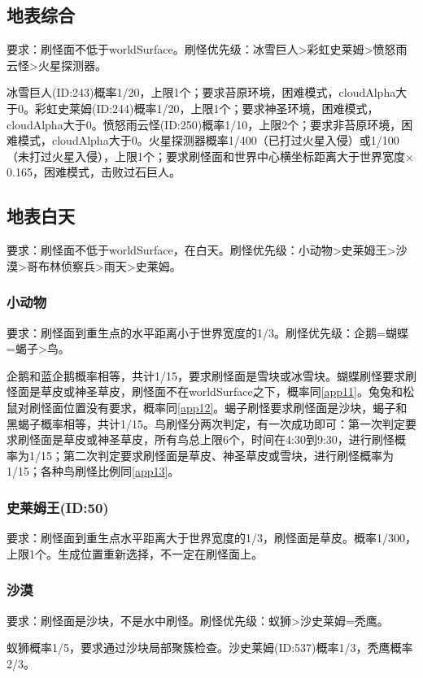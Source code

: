 \subsection{地表综合}
要求：刷怪面不低于worldSurface。刷怪优先级：冰雪巨人>彩虹史莱姆>愤怒雨云怪>火星探测器。

冰雪巨人(ID:243)概率1/20，上限1个；要求苔原环境，困难模式，cloudAlpha大于0。彩虹史莱姆(ID:244)概率1/20，上限1个；要求神圣环境，困难模式，cloudAlpha大于0。愤怒雨云怪(ID:250)概率1/10，上限2个；要求非苔原环境，困难模式，cloudAlpha大于0。火星探测器概率1/400（已打过火星入侵）或1/100（未打过火星入侵），上限1个；要求刷怪面和世界中心横坐标距离大于世界宽度$\times$0.165，困难模式，击败过石巨人。

\subsection{地表白天}
要求：刷怪面不低于worldSurface，在白天。刷怪优先级：小动物>史莱姆王>沙漠>哥布林侦察兵>雨天>史莱姆。

\subsubsection{小动物}
要求：刷怪面到重生点的水平距离小于世界宽度的1/3。刷怪优先级：企鹅=蝴蝶=蝎子>鸟。

企鹅和蓝企鹅概率相等，共计1/15，要求刷怪面是雪块或冰雪块。蝴蝶刷怪要求刷怪面是草皮或神圣草皮，刷怪面不在worldSurface之下，概率同\autoref{app11}。兔兔和松鼠对刷怪面位置没有要求，概率同\autoref{app12}。蝎子刷怪要求刷怪面是沙块，蝎子和黑蝎子概率相等，共计1/15。鸟刷怪分两次判定，有一次成功即可：第一次判定要求刷怪面是草皮或神圣草皮，所有鸟总上限6个，时间在4:30到9:30，进行刷怪概率为1/15；第二次判定要求刷怪面是草皮、神圣草皮或雪块，进行刷怪概率为1/15；各种鸟刷怪比例同\autoref{app13}。

\subsubsection{史莱姆王(ID:50)}
要求：刷怪面到重生点水平距离大于世界宽度的1/3，刷怪面是草皮。概率1/300，上限1个。生成位置重新选择，不一定在刷怪面上。

\subsubsection{沙漠}
要求：刷怪面是沙块，不是水中刷怪。刷怪优先级：蚁狮>沙史莱姆=秃鹰。

蚁狮概率1/5，要求通过沙块局部聚簇检查。沙史莱姆(ID:537)概率1/3，秃鹰概率2/3。

